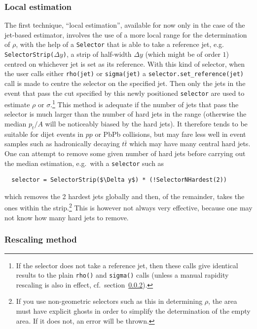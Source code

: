 \documentclass[12pt,a4]{article}
\newcommand{\ttt}[1]{{\small\texttt{#1}}}
\begin{document}
\subsubsection{Local estimation}
\label{sec:local-bkgd-estimation}

The first technique, ``local estimation'', available for now only in
the case of the jet-based estimator, involves the use of a more local
range for the determination of $\rho$, with the help of a
\ttt{Selector} that is able to take a reference jet,
e.g. \ttt{SelectorStrip(}$\Delta y$\ttt{)}, a strip of half-width
$\Delta y$ (which might be of order $1$) centred on whichever jet is
set as its reference.
%
With this kind of selector, when the user calls either \ttt{rho(jet)}
or \ttt{sigma(jet)} a \ttt{selector.set\_reference(jet)} call is made
to centre the selector on the specified jet. Then only the jets in the
event that
pass the cut specified by this newly positioned \ttt{selector} are
used to estimate $\rho$ or $\sigma$.\footnote{If the selector does not
  take a reference jet, then these calls give identical results to the
  plain \texttt{rho()} and \texttt{sigma()} calls (unless a manual
  rapidity rescaling is also in effect, cf.\
  section~\ref{sec:rescaled-bkgd-estimation}).}
%
This method is adequate if the number of jets that pass the selector
is much larger than the number of hard jets in the range (otherwise
the median $p_t/A$ will be noticeably biased by the hard jets).
%
It therefore tends to be suitable for dijet events in $pp$ or PbPb
collisions, but may fare less well in event samples such as
hadronically decaying $t\bar t$ which may have many central hard jets.
%
One can attempt to remove some given number of hard jets before
carrying out the median estimation, e.g.\ with a \ttt{selector} such
as
\begin{lstlisting}
  selector = SelectorStrip($\Delta y$) * (!SelectorNHardest(2))
\end{lstlisting}
which removes the 2 hardest jets globally and then, of the remainder,
takes the ones within the strip.\footnote{If you use non-geometric
  selectors such as this in determining $\rho$, the area must have
  explicit ghosts in order to simplify the determination of the empty
  area. If it does not, an error will be thrown.}
%
This is however not always very effective, because one may not know
how many hard jets to remove.

\subsubsection{Rescaling method}
\label{sec:rescaled-bkgd-estimation}
\end{document}
